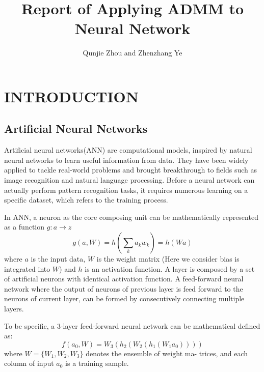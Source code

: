 \documentclass[letterpaper, 10 pt, conference]{ieeeconf}  %
\title{\LARGE \bf
Report of Applying ADMM to Neural Network
}
\author{Qunjie Zhou and Zhenzhang Ye%
}
\begin{document}
\maketitle
\thispagestyle{empty}
\pagestyle{empty}

\section{INTRODUCTION}
\subsection{Artificial Neural Networks} 
Artificial neural networks(ANN) are computational models, inspired by natural neural networks to learn useful information from data. They have been widely applied to tackle real-world problems and brought breakthrough to fields such as image recognition and natural language processing.  Before a neural network can actually perform pattern recognition tasks, it requires numerous learning on a specific dataset, which refers to the training process.
 
 In ANN, a neuron as the core composing unit can be mathematically represented as a function $g: a \rightarrow z$
 \begin{equation}
	g(a, W)= h(\displaystyle\sum_{k}a_kw_k) = h(Wa)
\end{equation}
where $a$ is the input data, $W$ is the weight matrix (Here we consider bias is integrated into $W$) and $h$ is an activation function\cite{1}. A layer is composed by a set of artificial neurons with identical activation function. A feed-forward neural network where the output of neurons of previous layer is feed forward to the neurons of current layer, can be formed by consecutively connecting multiple layers.

To be specific, a 3-layer feed-forward neural network can be mathematical defined as:
\begin{equation} \label{eq:network}
	f(a_0, W) = W_3(h_2(W_2(h_1(W_1a_0))))
\end{equation}
where $W = \{W_1, W_2, W_3\}$ denotes the ensemble of weight ma- trices, and each column of input $a_0$ is a training sample.
\end{document}
